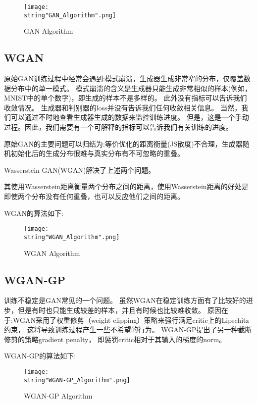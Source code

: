 \documentclass[UTF8]{ctexart}
\begin{document}
\begin{figure}[H]
    \begin{center}
        \texttt{[image: \\string"GAN\_Algorithm".png]}
    \caption{GAN Algorithm}
    \label{fig:2}
    \end{center}
    \end{figure}
\par



\subsection{WGAN}
原始GAN训练过程中经常会遇到:模式崩溃，生成器生成非常窄的分布，仅覆盖数据分布中的单一模式。 
模式崩溃的含义是生成器只能生成非常相似的样本(例如，MNIST中的单个数字)，即生成的样本不是多样的。
此外没有指标可以告诉我们收敛情况。
生成器和判别器的loss并没有告诉我们任何收敛相关信息。
当然，我们可以通过不时地查看生成器生成的数据来监控训练进度。
但是，这是一个手动过程。因此，我们需要有一个可解释的指标可以告诉我们有关训练的进度。\par


原始GAN的主要问题可以归结为:等价优化的距离衡量(JS散度)不合理，生成器随机初始化后的生成分布很难与真实分布有不可忽略的重叠。\par

Wasserstein GAN(WGAN)\cite{arjovsky2017wasserstein}解决了上述两个问题。\par
其使用Wasserstein距离衡量两个分布之间的距离，使用Wasserstein距离的好处是即使两个分布没有任何重叠，也可以反应他们之间的距离。\par
WGAN的算法如下:\par 
\begin{figure}[H]
    \begin{center}
        \texttt{[image: \\string"WGAN\_Algorithm".png]}
    \caption{WGAN Algorithm}
    \label{fig:3}
    \end{center}
    \end{figure}
\par

\subsection{WGAN-GP}
训练不稳定是GAN常见的一个问题。
虽然WGAN在稳定训练方面有了比较好的进步，但是有时也只能生成较差的样本，并且有时候也比较难收敛。
原因在于:WGAN采用了权重修剪（weight clipping）策略来强行满足critic上的Lipschitz约束，
这将导致训练过程产生一些不希望的行为。
WGAN-GP\cite{gulrajani2017improved}提出了另一种截断修剪的策略gradient penalty，
即惩罚critic相对于其输入的梯度的norm。\par 
WGAN-GP的算法如下:\par 
\begin{figure}[H]
    \begin{center}
        \texttt{[image: \\string"WGAN-GP\_Algorithm".png]}
    \caption{WGAN-GP Algorithm}
    \label{fig:4}
    \end{center}
    \end{figure}
\par
\end{document}
